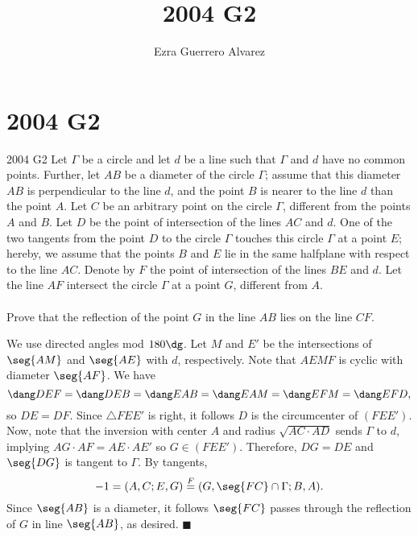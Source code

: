 \documentclass[14pt]{article}
\title{2004 G2}
\author{Ezra Guerrero Alvarez}
\begin{document}
\maketitle
	
\section*{2004 G2}

\begin{statement}{2004 G2}
	Let $\Gamma$ be a circle and let $d$ be a line such that $\Gamma$ and $d$ have no common points. Further, let $AB$ be a diameter of the circle $\Gamma$; assume that this diameter $AB$ is perpendicular to the line $d$, and the point $B$ is nearer to the line $d$ than the point $A$. Let $C$ be an arbitrary point on the circle $\Gamma$, different from the points $A$ and $B$. Let $D$ be the point of intersection of the lines $AC$ and $d$. One of the two tangents from the point $D$ to the circle $\Gamma$ touches this circle $\Gamma$ at a point $E$; hereby, we assume that the points $B$ and $E$ lie in the same halfplane with respect to the line $AC$. Denote by $F$ the point of intersection of the lines $BE$ and $d$. Let the line $AF$ intersect the circle $\Gamma$ at a point $G$, different from $A$. \\\\
	Prove that the reflection of the point $G$ in the line $AB$ lies on the line $CF$.
\end{statement}
We use directed angles mod $180\dg$. Let $M$ and $E'$ be the intersections of $\seg{AM}$ and $\seg{AE}$ with $d$, respectively. Note that $AEMF$ is cyclic with diameter $\seg{AF}$. We have
\[ \dang DEF = \dang DEB = \dang EAB = \dang EAM = \dang EFM = \dang EFD, \]
so $DE=DF$. Since $\triangle FEE'$ is right, it follows $D$ is the circumcenter of $(FEE')$. Now, note that the inversion with center $A$ and radius $\sqrt{AC\cdot AD}$ sends $\Gamma$ to $d$, implying $AG\cdot AF = AE\cdot AE'$ so $G\in(FEE')$. Therefore, $DG=DE$ and $\seg{DG}$ is tangent to $\Gamma$. By tangents,
\[ -1=(A,C;E,G)\stackrel F=(G,\seg{FC}\cap\Gamma;B,A). \]
Since $\seg{AB}$ is a diameter, it follows $\seg{FC}$ passes through the reflection of $G$ in line $\seg{AB}$, as desired. $\blacksquare$
	
\end{document}
